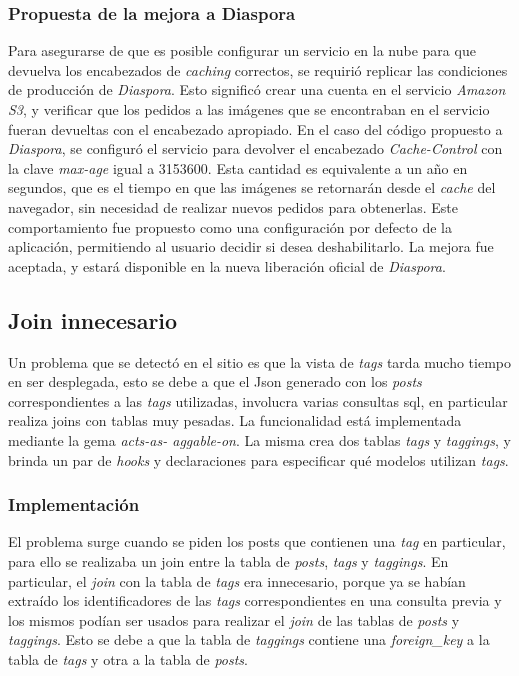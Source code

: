 \subsubsection{Propuesta de la mejora a Diaspora}

Para asegurarse de que es posible configurar un servicio en la nube para que devuelva los encabezados de \emph{caching} correctos, se requirió replicar las condiciones de
producción de \emph{Diaspora}. Esto significó crear una cuenta en el servicio \emph{Amazon S3}, y verificar que los pedidos a las imágenes que se encontraban en el servicio fueran
devueltas con el encabezado apropiado. En el caso del código propuesto a \emph{Diaspora}, se configuró el servicio para devolver el encabezado \emph{Cache-Control} con
la clave \emph{max-age} igual a 3153600. Esta cantidad es equivalente a un año en segundos, que es el tiempo en que las imágenes se retornarán desde el
\emph{cache} del navegador, sin necesidad de realizar nuevos pedidos para obtenerlas. Este comportamiento fue propuesto como una configuración por defecto de la aplicación, permitiendo al usuario decidir si desea deshabilitarlo. La mejora fue aceptada, y estará disponible en la nueva liberación oficial de \emph{Diaspora}.

\subsection{Join innecesario}

Un problema que se detectó en el sitio es que la vista de \emph{tags} tarda mucho tiempo en ser desplegada, esto se debe a que el Json generado con los \emph{posts} correspondientes a
las \emph{tags} utilizadas, involucra varias consultas sql, en particular realiza joins con tablas muy pesadas. La funcionalidad está implementada mediante la gema \emph{acts-as-
aggable-on}. La misma crea dos tablas \emph{tags} y \emph{taggings}, y brinda un par de \emph{hooks} y declaraciones para especificar qué modelos utilizan \emph{tags}.

\subsubsection{Implementación}

El problema surge cuando se piden los posts que contienen una \emph{tag} en particular, para ello se realizaba un join entre la tabla de \emph{posts}, \emph{tags} y
\emph{taggings}. En particular, el \emph{join} con la tabla de \emph{tags} era innecesario, porque ya se habían extraído los identificadores de las \emph{tags} correspondientes en una consulta
previa y los mismos podían ser usados para realizar el \emph{join} de las tablas de \emph{posts} y \emph{taggings}. Esto se debe a que la tabla de \emph{taggings} contiene una
\emph{foreign\_key} a la tabla de \emph{tags} y otra a la tabla de \emph{posts}.

